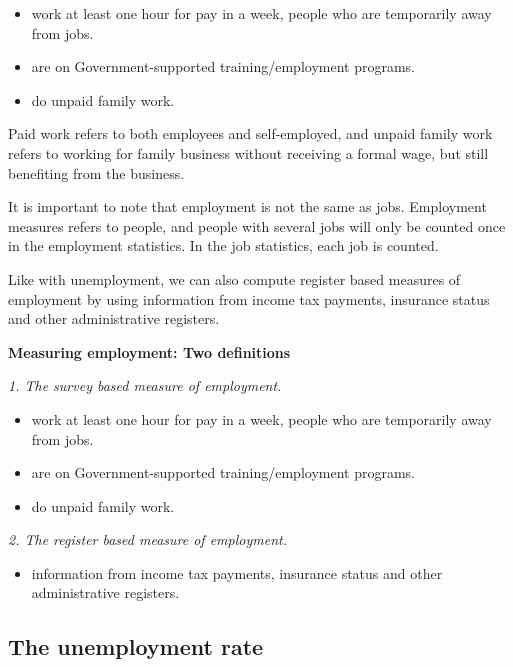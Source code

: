 \documentclass[]{book}
\providecommand{\tightlist}{%
  \setlength{\itemsep}{0pt}\setlength{\parskip}{0pt}}
\newenvironment{myblock}%
{%
 \begin{tcolorbox}%
}%
{\end{tcolorbox}}%
\begin{document}
\begin{itemize}
\tightlist
\item
  work at least one hour for pay in a week, people who are temporarily away from jobs.
\item
  are on Government-supported training/employment programs.
\item
  do unpaid family work.
\end{itemize}

Paid work refers to both employees and self-employed, and unpaid family work refers to working for family business without receiving a formal wage, but still benefiting from the business.

It is important to note that employment is not the same as jobs. Employment measures refers to people, and people with several jobs will only be counted once in the employment statistics. In the job statistics, each job is counted.

Like with unemployment, we can also compute register based measures of employment by using information from income tax payments, insurance status and other administrative registers.

\begin{myblock}
\textbf{Measuring employment: Two definitions}

\emph{1. The survey based measure of employment.}

\begin{itemize}
\tightlist
\item
  work at least one hour for pay in a week, people who are temporarily
  away from jobs.
\item
  are on Government-supported training/employment programs.
\item
  do unpaid family work.
\end{itemize}

\emph{2. The register based measure of employment.}

\begin{itemize}
\tightlist
\item
  information from income tax payments, insurance status and other
  administrative registers.
\end{itemize}
\end{myblock}

\hypertarget{the-unemployment-rate}{%
\subsection{The unemployment rate}\label{the-unemployment-rate}}
\end{document}
